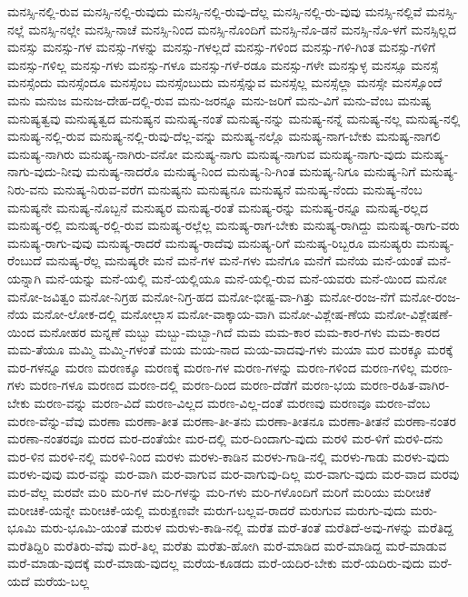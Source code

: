 {ಮನಸ್ಸಿ-ನಲ್ಲಿ-ರುವ
ಮನಸ್ಸಿ-ನಲ್ಲಿ-ರುವುದು
ಮನಸ್ಸಿ-ನಲ್ಲಿ-ರುವು-ದೆಲ್ಲ
ಮನಸ್ಸಿ-ನಲ್ಲಿ-ರು-ವುವು
ಮನಸ್ಸಿ-ನಲ್ಲಿವೆ
ಮನಸ್ಸಿ-ನಲ್ಲೆ
ಮನಸ್ಸಿ-ನಲ್ಲೇ
ಮನಸ್ಸಿ-ನಾಚೆ
ಮನಸ್ಸಿ-ನಿಂದ
ಮನಸ್ಸಿ-ನೊಂದಿಗೆ
ಮನಸ್ಸಿ-ನೊ-ಡನೆ
ಮನಸ್ಸಿ-ನೊ-ಳಗೆ
ಮನಸ್ಸಿಲ್ಲದ
ಮನಸ್ಸು
ಮನಸ್ಸು-ಗಳ
ಮನಸ್ಸು-ಗಳನ್ನು
ಮನಸ್ಸು-ಗಳಲ್ಲದೆ
ಮನಸ್ಸು-ಗಳಿಂದ
ಮನಸ್ಸು-ಗಳಿ-ಗಿಂತ
ಮನಸ್ಸು-ಗಳಿಗೆ
ಮನಸ್ಸು-ಗಳಿಲ್ಲ
ಮನಸ್ಸು-ಗಳು
ಮನಸ್ಸು-ಗಳೂ
ಮನಸ್ಸು-ಗಳೆ-ರಡೂ
ಮನಸ್ಸು-ಗಳೇ
ಮನಸ್ಸುಳ್ಳ
ಮನಸ್ಸೂ
ಮನಸ್ಸೆ
ಮನಸ್ಸೆಂದು
ಮನಸ್ಸೆಂದೂ
ಮನಸ್ಸೆಂಬ
ಮನಸ್ಸೆಂಬುದು
ಮನಸ್ಸೆನ್ನುವ
ಮನಸ್ಸೆಲ್ಲ
ಮನಸ್ಸೆಲ್ಲಾ
ಮನಸ್ಸೇ
ಮನಸ್ಸೊಂದೆ
ಮನು
ಮನುಜ
ಮನುಜ-ದೇಹ-ದಲ್ಲಿ-ರುವ
ಮನು-ಜರನ್ನೂ
ಮನು-ಜರಿಗೆ
ಮನು-ವಿಗೆ
ಮನು-ವೆಂಬ
ಮನುಷ್ಯ
ಮನುಷ್ಯತ್ವವು
ಮನುಷ್ಯತ್ವದ
ಮನುಷ್ಯನ
ಮನುಷ್ಯ-ನಂತೆ
ಮನುಷ್ಯ-ನನ್ನು
ಮನುಷ್ಯ-ನನ್ನೆ
ಮನುಷ್ಯ-ನಲ್ಲ
ಮನುಷ್ಯ-ನಲ್ಲಿ
ಮನುಷ್ಯ-ನಲ್ಲಿ-ರುವ
ಮನುಷ್ಯ-ನಲ್ಲಿ-ರುವು-ದೆಲ್ಲ-ವನ್ನು
ಮನುಷ್ಯ-ನಲ್ಲೊ
ಮನುಷ್ಯ-ನಾಗ-ಬೇಕು
ಮನುಷ್ಯ-ನಾಗಲಿ
ಮನುಷ್ಯ-ನಾಗಿರು
ಮನುಷ್ಯ-ನಾಗಿರು-ವನೋ
ಮನುಷ್ಯ-ನಾಗು
ಮನುಷ್ಯ-ನಾಗುವ
ಮನುಷ್ಯ-ನಾಗು-ವುದು
ಮನುಷ್ಯ-ನಾಗು-ವುದು-ನೀವು
ಮನುಷ್ಯ-ನಾದರೊ
ಮನುಷ್ಯ-ನಿಂದ
ಮನುಷ್ಯ-ನಿ-ಗಿಂತ
ಮನುಷ್ಯ-ನಿಗೂ
ಮನುಷ್ಯ-ನಿಗೆ
ಮನುಷ್ಯ-ನಿರು-ವನು
ಮನುಷ್ಯ-ನಿರುವ-ವರೆಗ
ಮನುಷ್ಯನು
ಮನುಷ್ಯನೂ
ಮನುಷ್ಯನೆ
ಮನುಷ್ಯ-ನೆಂದು
ಮನುಷ್ಯ-ನೆಂಬ
ಮನುಷ್ಯನೇ
ಮನುಷ್ಯ-ನೊಬ್ಬನೆ
ಮನುಷ್ಯರ
ಮನುಷ್ಯ-ರಂತೆ
ಮನುಷ್ಯ-ರನ್ನು
ಮನುಷ್ಯ-ರನ್ನೂ
ಮನುಷ್ಯ-ರಲ್ಲದ
ಮನುಷ್ಯ-ರಲ್ಲಿ
ಮನುಷ್ಯ-ರಲ್ಲಿ-ರುವ
ಮನುಷ್ಯ-ರಲ್ಲೆಲ್ಲ
ಮನುಷ್ಯ-ರಾಗ-ಬೇಕು
ಮನುಷ್ಯ-ರಾಗಿದ್ದು
ಮನುಷ್ಯ-ರಾಗು-ವರು
ಮನುಷ್ಯ-ರಾಗು-ವುವು
ಮನುಷ್ಯ-ರಾದರೆ
ಮನುಷ್ಯ-ರಾದೆವು
ಮನುಷ್ಯ-ರಿಗೆ
ಮನುಷ್ಯ-ರಿಬ್ಬರೂ
ಮನುಷ್ಯರು
ಮನುಷ್ಯ-ರೆಂಬುದೆ
ಮನುಷ್ಯ-ರೆಲ್ಲ
ಮನುಷ್ಯರೇ
ಮನೆ
ಮನೆ-ಗಳ
ಮನೆ-ಗಳು
ಮನೆಗೂ
ಮನೆಗೆ
ಮನೆಯ
ಮನೆ-ಯಂತೆ
ಮನೆ-ಯನ್ನಾಗಿ
ಮನೆ-ಯನ್ನು
ಮನೆ-ಯಲ್ಲಿ
ಮನೆ-ಯಲ್ಲಿಯೂ
ಮನೆ-ಯಲ್ಲಿ-ರುವ
ಮನೆ-ಯವರು
ಮನೆ-ಯಿಂದ
ಮನೋ
ಮನೋ-ಜವಿತ್ವಂ
ಮನೋ-ನಿಗ್ರಹ
ಮನೋ-ನಿಗ್ರ-ಹದ
ಮನೋ-ಭೀಷ್ಟ-ವಾ-ಗಿತ್ತು
ಮನೋ-ರಂಜ-ನೆಗೆ
ಮನೋ-ರಂಜ-ನೆಯ
ಮನೋ-ಲೋಕ-ದಲ್ಲಿ
ಮನೋಲ್ಲಾಸ
ಮನೋ-ವಾಕ್ಕಾಯ-ವಾಗಿ
ಮನೋ-ವಿಶ್ಲೇಷ-ಣೆಯ
ಮನೋ-ವಿಶ್ಲೇಷಣೆ-ಯಿಂದ
ಮನೋಹರ
ಮನ್ನಣೆ
ಮಬ್ಬು
ಮಬ್ಬು-ಮಬ್ಬಾ-ಗಿದೆ
ಮಮ
ಮಮ-ಕಾರ
ಮಮ-ಕಾರ-ಗಳು
ಮಮ-ಕಾರದ
ಮಮ-ತೆಯೂ
ಮಮ್ಮಿ
ಮಮ್ಮಿ-ಗಳಂತೆ
ಮಯ
ಮಯ-ನಾದ
ಮಯ-ವಾದವು-ಗಳು
ಮಯಾ
ಮರ
ಮರಕ್ಕೂ
ಮರಕ್ಕೆ
ಮರ-ಗಳನ್ನೂ
ಮರಣ
ಮರಣಕ್ಕೂ
ಮರಣಕ್ಕೆ
ಮರಣ-ಗಳ
ಮರಣ-ಗಳನ್ನು
ಮರಣ-ಗಳಿಂದ
ಮರಣ-ಗಳಿಲ್ಲ
ಮರಣ-ಗಳು
ಮರಣ-ಗಳೂ
ಮರಣದ
ಮರಣ-ದಲ್ಲಿ
ಮರಣ-ದಿಂದ
ಮರಣ-ದೆಡೆಗೆ
ಮರಣ-ಭಯ
ಮರಣ-ರಹಿತ-ವಾಗಿರ-ಬೇಕು
ಮರಣ-ವನ್ನು
ಮರಣ-ವಿದೆ
ಮರಣ-ವಿಲ್ಲದ
ಮರಣ-ವಿಲ್ಲ-ದಂತೆ
ಮರಣವು
ಮರಣವೂ
ಮರಣ-ವೆಂಬ
ಮರಣ-ವೆನ್ನು-ವೆವು
ಮರಣಾ
ಮರಣಾ-ತೀತ
ಮರಣಾ-ತೀ-ತನು
ಮರಣಾ-ತೀತನೂ
ಮರಣಾ-ತೀತನೆ
ಮರಣಾ-ನಂತರ
ಮರಣಾ-ನಂತರವೂ
ಮರದ
ಮರ-ದಂತೆಯೇ
ಮರ-ದಲ್ಲಿ
ಮರ-ದಿಂದಾಗು-ವುದು
ಮರಳಿ
ಮರ-ಳಿಗೆ
ಮರಳಿ-ದನು
ಮರ-ಳಿನ
ಮರಳಿ-ನಲ್ಲಿ
ಮರಳಿ-ನಿಂದ
ಮರಳು
ಮರಳು-ಕಾಡಿನ
ಮರಳು-ಗಾಡಿ-ನಲ್ಲಿ
ಮರಳು-ಗಾಡು
ಮರಳು-ವುದು
ಮರಳು-ವುವು
ಮರ-ವನ್ನು
ಮರ-ವಾಗಿ
ಮರ-ವಾಗುವ
ಮರ-ವಾಗುವು-ದಿಲ್ಲ
ಮರ-ವಾಗು-ವುದು
ಮರ-ವಾದ
ಮರವು
ಮರ-ವೆಲ್ಲ
ಮರವೇ
ಮರಿ
ಮರಿ-ಗಳ
ಮರಿ-ಗಳನ್ನು
ಮರಿ-ಗಳು
ಮರಿ-ಗಳೊಂದಿಗೆ
ಮರಿಗೆ
ಮರಿಯು
ಮರೀಚಿಕೆ
ಮರೀಚಿಕೆ-ಯನ್ನೇ
ಮರೀಚಿಕೆ-ಯಲ್ಲಿ
ಮರುಕ್ಷಣವೇ
ಮರುಗ-ಬಲ್ಲವ-ರಾದರೆ
ಮರುಗುವ
ಮರುಗು-ವುದು
ಮರು-ಭೂಮಿ
ಮರು-ಭೂಮಿ-ಯಂತೆ
ಮರುಳ
ಮರುಳು-ಕಾಡಿ-ನಲ್ಲಿ
ಮರೆತ
ಮರೆ-ತಂತೆ
ಮರೆತಿದೆ-ಅವು-ಗಳನ್ನು
ಮರೆತಿದ್ದ
ಮರೆತಿದ್ದಿರಿ
ಮರೆತಿರು-ವೆವು
ಮರೆ-ತಿಲ್ಲ
ಮರೆತು
ಮರೆತು-ಹೋಗಿ
ಮರೆ-ಮಾಡಿದ
ಮರೆ-ಮಾಡಿದ್ದ
ಮರೆ-ಮಾಡುವ
ಮರೆ-ಮಾಡು-ವುದಕ್ಕೆ
ಮರೆ-ಮಾಡು-ವುದಲ್ಲ
ಮರೆಯ-ಕೂಡದು
ಮರೆ-ಯದಿರ-ಬೇಕು
ಮರೆ-ಯದಿರು-ವುದು
ಮರೆ-ಯದೆ
ಮರೆಯ-ಬಲ್ಲ
}
